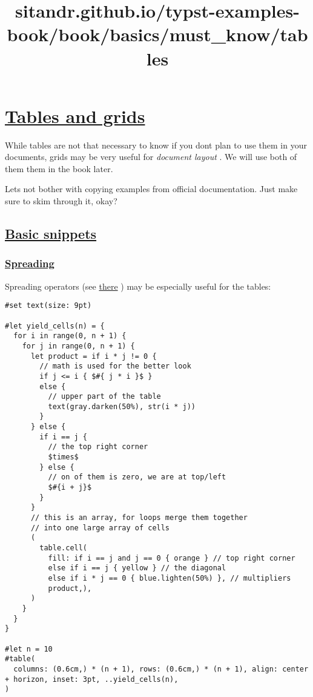 \title{sitandr.github.io/typst-examples-book/book/basics/must_know/tables}

\section{\texorpdfstring{\hyperref[tables-and-grids]{Tables and
grids}}{Tables and grids}}\label{tables-and-grids}

While tables are not that necessary to know if you don\textquotesingle t
plan to use them in your documents, grids may be very useful for
\emph{document layout} . We will use both of them them in the book
later.

Let\textquotesingle s not bother with copying examples from official
documentation. Just make sure to skim through it, okay?

\subsection{\texorpdfstring{\hyperref[basic-snippets]{Basic
snippets}}{Basic snippets}}\label{basic-snippets}

\subsubsection{\texorpdfstring{\hyperref[spreading]{Spreading}}{Spreading}}\label{spreading}

Spreading operators (see \href{../scripting/arguments.html}{there} ) may
be especially useful for the tables:

\begin{verbatim}
#set text(size: 9pt)

#let yield_cells(n) = {
  for i in range(0, n + 1) {
    for j in range(0, n + 1) {
      let product = if i * j != 0 {
        // math is used for the better look 
        if j <= i { $#{ j * i }$ } 
        else {
          // upper part of the table
          text(gray.darken(50%), str(i * j))
        }
      } else {
        if i == j {
          // the top right corner 
          $times$
        } else {
          // on of them is zero, we are at top/left
          $#{i + j}$
        }
      }
      // this is an array, for loops merge them together
      // into one large array of cells
      (
        table.cell(
          fill: if i == j and j == 0 { orange } // top right corner
          else if i == j { yellow } // the diagonal
          else if i * j == 0 { blue.lighten(50%) }, // multipliers
          product,),
      )
    }
  }
}

#let n = 10
#table(
  columns: (0.6cm,) * (n + 1), rows: (0.6cm,) * (n + 1), align: center + horizon, inset: 3pt, ..yield_cells(n),
)
\end{verbatim}

